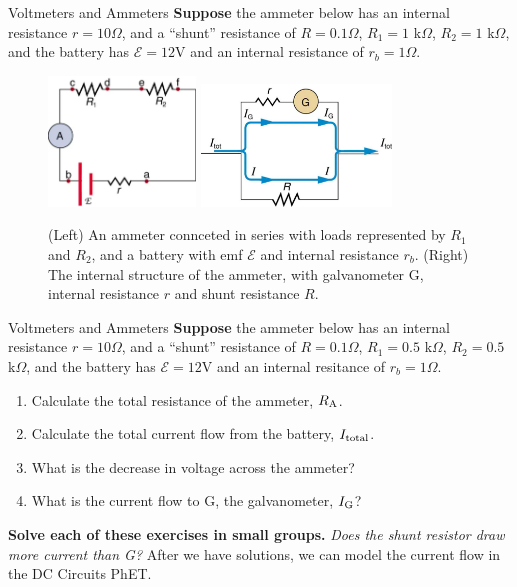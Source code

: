 \documentclass{beamer}
\begin{document}
\begin{frame}{Voltmeters and Ammeters}
\small
\textbf{\alert{Suppose}} the ammeter below has an internal resistance $r = 10\Omega$, and a ``shunt'' resistance of $R = 0.1\Omega$, $R_1 = 1$ k$\Omega$, $R_2 = 1$ k$\Omega$, and the battery has $\mathcal{E} = 12$V and an internal resistance of $r_b = 1 \Omega$.
\footnotesize
\begin{figure}
\centering
\includegraphics[width=0.35\textwidth]{figures/ammeter.png} \hspace{0.5cm}
\includegraphics[width=0.45\textwidth]{figures/galvo_2.png}
\caption{\label{fig:galvo2} (Left) An ammeter connceted in series with loads represented by $R_1$ and $R_2$, and a battery with emf $\mathcal{E}$ and internal resistance $r_b$. (Right) The internal structure of the ammeter, with galvanometer G, internal resistance $r$ and shunt resistance $R$.}
\end{figure}
\end{frame}

\begin{frame}{Voltmeters and Ammeters}
\small
\textbf{\alert{Suppose}} the ammeter below has an internal resistance $r = 10\Omega$, and a ``shunt'' resistance of $R = 0.1\Omega$, $R_1 = 0.5$ k$\Omega$, $R_2 = 0.5$ k$\Omega$, and the battery has $\mathcal{E} = 12$V and an internal resitance of $r_b = 1 \Omega$.
\begin{enumerate}
\item Calculate the total resistance of the ammeter, $R_{\rm A}$.
\item Calculate the total current flow from the battery, $I_{\rm total}$.
\item What is the decrease in voltage across the ammeter?
\item What is the current flow to G, the galvanometer, $I_{\rm G}$?
\end{enumerate}
\textbf{Solve each of these exercises in small groups.}  \textit{Does the shunt resistor draw more current than G?}  After we have solutions, we can model the current flow in the DC Circuits PhET.
\end{frame}
\end{document}
